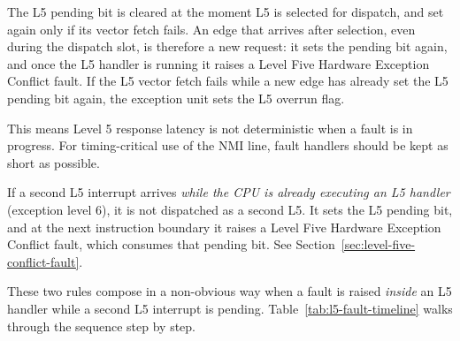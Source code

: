 The L5 pending bit is cleared at the moment L5 is selected for dispatch, and set again only if its vector fetch fails.
An edge that arrives after selection, even during the dispatch slot, is therefore a new request: it sets the pending
bit again, and once the L5 handler is running it raises a Level Five Hardware Exception Conflict fault. If the L5
vector fetch fails while a new edge has already set the L5 pending bit again, the exception unit sets the L5 overrun
flag.

This means Level 5 response latency is not deterministic when a fault is in progress. For timing-critical use of the
NMI line, fault handlers should be kept as short as possible.

If a second L5 interrupt arrives \textit{while the CPU is already executing an L5 handler} (exception level 6), it is
not dispatched as a second L5. It sets the L5 pending bit, and at the next instruction boundary it raises a Level Five
Hardware Exception Conflict fault, which consumes that pending bit. See Section~\ref{sec:level-five-conflict-fault}.

These two rules compose in a non-obvious way when a fault is raised \textit{inside} an L5 handler while a second L5
interrupt is pending. Table~\ref{tab:l5-fault-timeline} walks through the sequence step by step.

